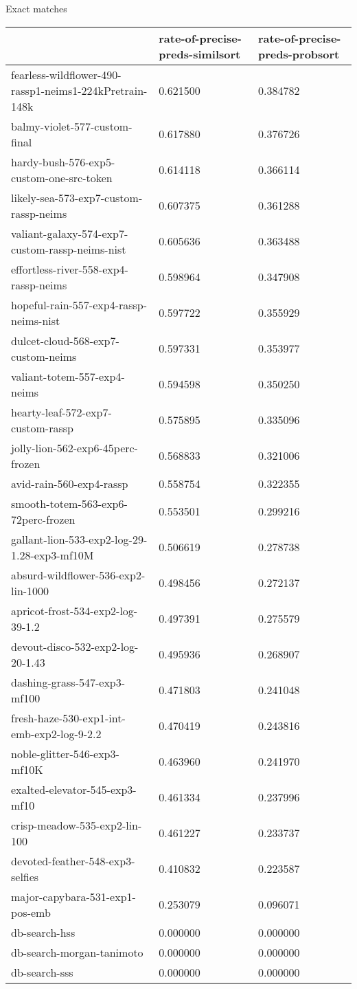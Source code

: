 Exact matches
\begin{tabular}{lll}
\toprule
 & rate-of-precise-preds-similsort & rate-of-precise-preds-probsort \\
\midrule
fearless-wildflower-490-rassp1-neims1-224kPretrain-148k & 0.621500 & 0.384782 \\
balmy-violet-577-custom-final & 0.617880 & 0.376726 \\
hardy-bush-576-exp5-custom-one-src-token & 0.614118 & 0.366114 \\
likely-sea-573-exp7-custom-rassp-neims & 0.607375 & 0.361288 \\
valiant-galaxy-574-exp7-custom-rassp-neims-nist & 0.605636 & 0.363488 \\
effortless-river-558-exp4-rassp-neims & 0.598964 & 0.347908 \\
hopeful-rain-557-exp4-rassp-neims-nist & 0.597722 & 0.355929 \\
dulcet-cloud-568-exp7-custom-neims & 0.597331 & 0.353977 \\
valiant-totem-557-exp4-neims & 0.594598 & 0.350250 \\
hearty-leaf-572-exp7-custom-rassp & 0.575895 & 0.335096 \\
jolly-lion-562-exp6-45perc-frozen & 0.568833 & 0.321006 \\
avid-rain-560-exp4-rassp & 0.558754 & 0.322355 \\
smooth-totem-563-exp6-72perc-frozen & 0.553501 & 0.299216 \\
gallant-lion-533-exp2-log-29-1.28-exp3-mf10M & 0.506619 & 0.278738 \\
absurd-wildflower-536-exp2-lin-1000 & 0.498456 & 0.272137 \\
apricot-frost-534-exp2-log-39-1.2 & 0.497391 & 0.275579 \\
devout-disco-532-exp2-log-20-1.43 & 0.495936 & 0.268907 \\
dashing-grass-547-exp3-mf100 & 0.471803 & 0.241048 \\
fresh-haze-530-exp1-int-emb-exp2-log-9-2.2 & 0.470419 & 0.243816 \\
noble-glitter-546-exp3-mf10K & 0.463960 & 0.241970 \\
exalted-elevator-545-exp3-mf10 & 0.461334 & 0.237996 \\
crisp-meadow-535-exp2-lin-100 & 0.461227 & 0.233737 \\
devoted-feather-548-exp3-selfies & 0.410832 & 0.223587 \\
major-capybara-531-exp1-pos-emb & 0.253079 & 0.096071 \\
db-search-hss & 0.000000 & 0.000000 \\
db-search-morgan-tanimoto & 0.000000 & 0.000000 \\
db-search-sss & 0.000000 & 0.000000 \\
\bottomrule
\end{tabular}


